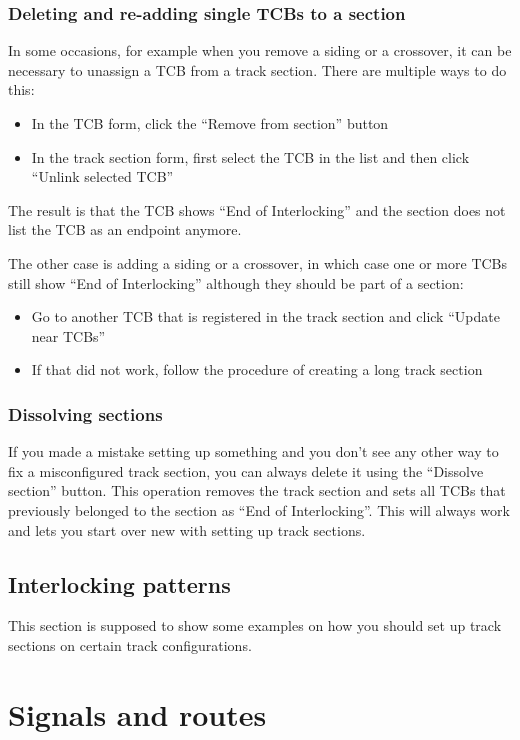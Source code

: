 \documentclass[english]{paper}
\begin{document}
\subsubsection{Deleting and re-adding single TCBs to a section}

In some occasions, for example when you remove a siding or a crossover,
it can be necessary to unassign a TCB from a track section. There
are multiple ways to do this:
\begin{itemize}
\item In the TCB form, click the ``Remove from section'' button
\item In the track section form, first select the TCB in the list and then
click ``Unlink selected TCB''
\end{itemize}
The result is that the TCB shows ``End of Interlocking'' and the
section does not list the TCB as an endpoint anymore.

The other case is adding a siding or a crossover, in which case one
or more TCBs still show ``End of Interlocking'' although they should
be part of a section:
\begin{itemize}
\item Go to another TCB that is registered in the track section and click
``Update near TCBs''
\item If that did not work, follow the procedure of creating a long track
section
\end{itemize}

\subsubsection{Dissolving sections}

If you made a mistake setting up something and you don't see any other
way to fix a misconfigured track section, you can always delete it
using the ``Dissolve section'' button. This operation removes the
track section and sets all TCBs that previously belonged to the section
as ``End of Interlocking''. This will always work and lets you start
over new with setting up track sections.

\subsection{Interlocking patterns}

This section is supposed to show some examples on how you should set
up track sections on certain track configurations.

\section{Signals and routes}
\end{document}
